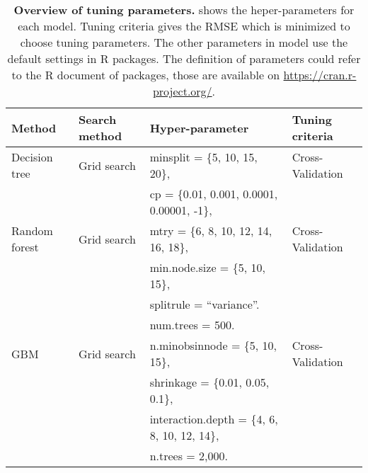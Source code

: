 \begin{table}[ht]
\centering
\caption{{\bf Overview of tuning parameters.} shows the heper-parameters for each model. Tuning criteria gives the RMSE which is minimized to choose tuning parameters. The other parameters in model use the default settings in \textsf{R} packages. The definition of parameters could refer to the \textsf{R} document of packages, those are available on \href{https://cran.r-project.org/web/packages/available_packages_by_name.html}{https://cran.r-project.org/}. \setlength{\baselineskip}{1.25em}}
\label{tab_summary_tune_parameters}
\begin{threeparttable}
\begin{tabular}{l l L{10cm} L{3cm}}
\toprule\toprule
Method            &Search method &Hyper-parameter                                     &Tuning criteria\\
\hline
Decision tree     &Grid search   &\textsf{minsplit} = \{5, 10, 15, 20\},              &Cross-Validation\\
                  &              &\textsf{cp} = \{0.01, 0.001, 0.0001, 0.00001, -1\}, &\\
Random forest     &Grid search   &\textsf{mtry} = \{6, 8, 10, 12, 14, 16, 18\},       &Cross-Validation\\
                  &              &\textsf{min.node.size} = \{5, 10, 15\},             &\\
                  &              &\textsf{splitrule} = ``variance''.                  &\\
                  &              &\textsf{num.trees} = 500.                           &\\
GBM               &Grid search   &\textsf{n.minobsinnode} = \{5, 10, 15\},            &Cross-Validation\\
                  &              &\textsf{shrinkage} = \{0.01, 0.05, 0.1\},           &\\
                  &              &\textsf{interaction.depth} = \{4, 6, 8, 10, 12, 14\}, &\\
                  &              &\textsf{n.trees} = 2,000.                           &\\
\bottomrule\bottomrule
\end{tabular}
\end{threeparttable}
\end{table}